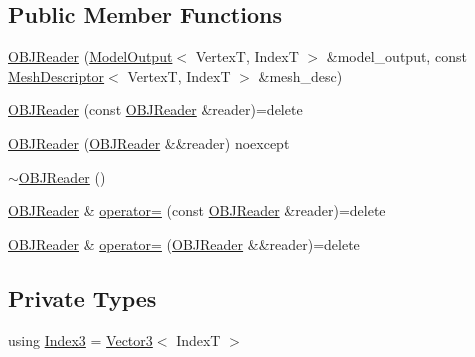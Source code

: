 \subsection*{Public Member Functions}
\begin{DoxyCompactItemize}
\item 
\hyperlink{classmage_1_1loader_1_1_o_b_j_reader_ac0e4964f2898f4eec0212c6c292825c0}{O\+B\+J\+Reader} (\hyperlink{structmage_1_1_model_output}{Model\+Output}$<$ VertexT, IndexT $>$ \&model\+\_\+output, const \hyperlink{structmage_1_1_mesh_descriptor}{Mesh\+Descriptor}$<$ VertexT, IndexT $>$ \&mesh\+\_\+desc)
\item 
\hyperlink{classmage_1_1loader_1_1_o_b_j_reader_a078557b2ea85ea5dfc4d6926d1ff266d}{O\+B\+J\+Reader} (const \hyperlink{classmage_1_1loader_1_1_o_b_j_reader}{O\+B\+J\+Reader} \&reader)=delete
\item 
\hyperlink{classmage_1_1loader_1_1_o_b_j_reader_a95867e96602f85c6c23f490635530c00}{O\+B\+J\+Reader} (\hyperlink{classmage_1_1loader_1_1_o_b_j_reader}{O\+B\+J\+Reader} \&\&reader) noexcept
\item 
\hyperlink{classmage_1_1loader_1_1_o_b_j_reader_a632f50cdf9e91ce2c1226b583ef6fde6}{$\sim$\+O\+B\+J\+Reader} ()
\item 
\hyperlink{classmage_1_1loader_1_1_o_b_j_reader}{O\+B\+J\+Reader} \& \hyperlink{classmage_1_1loader_1_1_o_b_j_reader_a83f3553355ca35eada2267caebd6cbca}{operator=} (const \hyperlink{classmage_1_1loader_1_1_o_b_j_reader}{O\+B\+J\+Reader} \&reader)=delete
\item 
\hyperlink{classmage_1_1loader_1_1_o_b_j_reader}{O\+B\+J\+Reader} \& \hyperlink{classmage_1_1loader_1_1_o_b_j_reader_a0dc19f003490ad91b6ed9ee8365e3bd4}{operator=} (\hyperlink{classmage_1_1loader_1_1_o_b_j_reader}{O\+B\+J\+Reader} \&\&reader)=delete
\end{DoxyCompactItemize}
\subsection*{Private Types}
\begin{DoxyCompactItemize}
\item 
using \hyperlink{classmage_1_1loader_1_1_o_b_j_reader_af9aab131e88c5a3a0f29b156c4c97096}{Index3} = \hyperlink{structmage_1_1_vector3}{Vector3}$<$ IndexT $>$
\end{DoxyCompactItemize}
